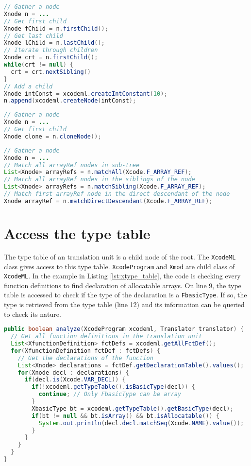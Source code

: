 \begin{lstlisting}[label=lst:xnode_node, language=Java, caption=XtypeTable]
// Gather a node
Xnode n = ...
// Get first child
Xnode fChild = n.firstChild();
// Get last child
Xnode lChild = n.lastChild();
// Iterate through children
Xnode crt = n.firstChild();
while(crt != null) {
  crt = crt.nextSibling()
}
// Add a child
Xnode intConst = xcodeml.createIntConstant(10);
n.append(xcodeml.createNode(intConst);
\end{lstlisting}

\begin{lstlisting}[label=lst:xnode_clone, language=Java, caption=XtypeTable]
// Gather a node
Xnode n = ...
// Get first child
Xnode clone = n.cloneNode();
\end{lstlisting}

\begin{lstlisting}[label=lst:xnode_match, language=Java, caption=XtypeTable]
// Gather a node
Xnode n = ...
// Match all arrayRef nodes in sub-tree
List<Xnode> arrayRefs = n.matchAll(Xcode.F_ARRAY_REF);
// Match all arrayRef nodes in the siblings of the node
List<Xnode> arrayRefs = n.matchSibling(Xcode.F_ARRAY_REF);
// Match first arrayRef node in the direct descendant of the node
Xnode arrayRef = n.matchDirectDescendant(Xcode.F_ARRAY_REF);
\end{lstlisting}

\section{Access the type table}
The type table of an \xcodemlf translation unit is a child node of the root. 
The \lstinline|XcodeML| class gives access to this type table. 
\lstinline|XcodeProgram| and \lstinline|Xmod| are child class of 
\lstinline|XcodeML|. 
In the example in Listing \ref{lst:xtype_table}, the code is checking
every function definitions to find declaration of allocatable arrays.
On line 9, the type table is accessed to check if the type of the 
declaration is a \lstinline|FbasicType|. If so, the type is retrieved from
the type table (line 12) and its information can be queried to check its
nature.

\begin{lstlisting}[label=lst:xtype_table, language=Java, caption=XtypeTable]
public boolean analyze(XcodeProgram xcodeml, Translator translator) {
  // Get all function definitions in the translation unit
  List<XfunctionDefinition> fctDefs = xcodeml.getAllFctDef();
  for(XfunctionDefinition fctDef : fctDefs) {
    // Get the declarations of the function
    List<Xnode> declarations = fctDef.getDeclarationTable().values();
    for(Xnode decl : declarations) {
      if(decl.is(Xcode.VAR_DECL)) {
        if(!xcodeml.getTypeTable().isBasicType(decl)) {
          continue; // Only FbasicType can be array
        }
        XbasicType bt = xcodeml.getTypeTable().getBasicType(decl);
        if(bt != null && bt.isArray() && bt.isAllocatable()) {
          System.out.println(decl.decl.matchSeq(Xcode.NAME).value());
        }
      }
    }
  }
}
\end{lstlisting}



